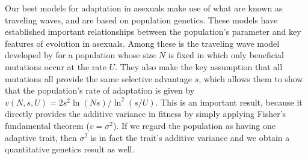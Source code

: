 \documentclass[11pt,twocolumn]{article}
\begin{document}
Our best models for adaptation in asexuals make use of what are known as traveling waves, and are based on population genetics. These models have established important relationships between the population's parameter and key features of evolution in asexuals. Among these is the traveling wave model developed by \cite{desai2007beneficial} for a population whose size $N$ is fixed in which only beneficial mutations occur at the rate $U$. They also make the key assumption that all mutations all provide the same selective advantage $s$, which allows them to show that the population's rate of adaptation is given by  $v(N,s,U) = 2s^2 \ln(N s)/\ln^2(s/U)$. This is an important result, because it directly provides the additive variance in fitness by simply applying Fisher's fundamental theorem ($v=\sigma^2$). If we regard the population as having one adaptive trait, then $\sigma^2$ is in fact the trait's additive variance and we obtain a quantitative genetics result as well.\par
% 
% 
% 
%
\end{document}
